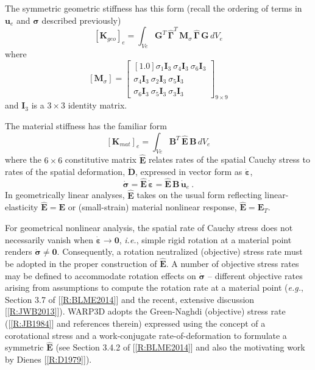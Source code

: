 \documentclass[11pt]{report}
\numberwithin{equation}{section}
\newcommand{\bmf } {\boldsymbol }  %
\newcommand{\eg}{\emph{e.g.},\xspace}
\newcommand{\ie}{\emph{i.e.},\xspace}
\newcommand{\nid}{\noindent}
\newcommand{\vareps}{\varepsilon}
\begin{document}
The symmetric geometric stiffness has this form (recall the ordering of  terms in $\bmf{u}_e$ and $\bmf{\sigma}$
described previously)
%
\begin{equation}\label{E:TSc}
 \left [ \mathbf{K}_{geo} \right ]_e =  
 \int_{Ve} \mathbf{G}^T \,\hat{\bmf{\Gamma}}^T\,\mathbf{M}_{\sigma}\,\hat{\bmf{\Gamma}} \,\mathbf{G} \, dV_e
\end{equation}
%
\nid where 
%
\begin{equation}\label{E:TSd}
 \left [ \mathbf{M}_{\sigma} \right ] =  
  \begin{bmatrix}[1.0]
\sigma_1 \mathbf{I}_3\ \sigma_4 \mathbf{I}_3 \ \sigma_6 \mathbf{I}_3  \\
 \sigma_4 \mathbf{I}_3\ \sigma_2 \mathbf{I}_3\ \sigma_5 \mathbf{I}_3  \\
\sigma_6 \mathbf{I}_3\ \sigma_5 \mathbf{I}_3\ \sigma_3 \mathbf{I}_3  
   \end{bmatrix}_{9\times9}
  \end{equation}
%
\nid  and $\mathbf{I}_3$ is a $3 \times 3$ identity matrix.

The material stiffness has the familiar form
%
\begin{equation}\label{E:TSe}
 \left [ \mathbf{K}_{mat} \right ]_e =  
 \int_{Ve} \mathbf{B}^T\, \hat{\mathbf{E}}\, \mathbf{B} \, dV_e
\end{equation}
%
\nid where the $6 \times 6$ constitutive matrix $\hat{\mathbf{E}}$ relates rates of the spatial Cauchy
stress to rates of the spatial deformation, $\dot{\mathbf{D}}$, expressed in vector 
form as $\dot{\bmf{\varepsilon}}$,
%
\begin{equation}\label{E:TSf}
 \dot{\bmf{\sigma}} = \hat{\mathbf{E}}\,\dot{\bmf{\varepsilon}} = 
 \hat{\mathbf{E}}\, \mathbf{B}\, \dot{\bmf{u}}_e\ .
\end{equation}
%
In geometrically linear analyses, $\hat{\mathbf{E}}$ takes on the usual form reflecting linear-elasticity
$\hat{\mathbf{E}}= \mathbf{E}$ or 
(small-strain) material nonlinear response, $\hat{\mathbf{E}}= \mathbf{E}_T$.

For geometrical nonlinear analysis, the spatial rate of 
Cauchy stress does not necessarily vanish when $\dot{\bmf{\vareps}}\rightarrow \bmf{0}$,
\ie simple rigid rotation at a material point renders $\dot{\bmf{\sigma}}\ne\bmf{0}$.
Consequently, a rotation neutralized (objective) stress rate must be adopted in the
proper construction of $\hat{\mathbf{E}}$. A number of objective stress rates may be defined to 
accommodate rotation effects on $\dot{\bmf{\sigma}}$ -- different objective 
rates arising from assumptions to compute the rotation rate at a material point (\eg
Section 3.7 of [\ref{R:BLME2014}]  and the recent, extensive discussion [\ref{R:JWB2013}]).
WARP3D adopts the Green-Naghdi (objective) stress rate ([\ref{R:JB1984}]
and references therein) 
expressed using the concept of a corotational stress and a work-conjugate rate-of-deformation  
to formulate a symmetric $\hat{\mathbf{E}}$ (see Section 3.4.2 of [\ref{R:BLME2014}] and also the 
motivating work by Dienes [\ref{R:D1979}]).
\end{document}
